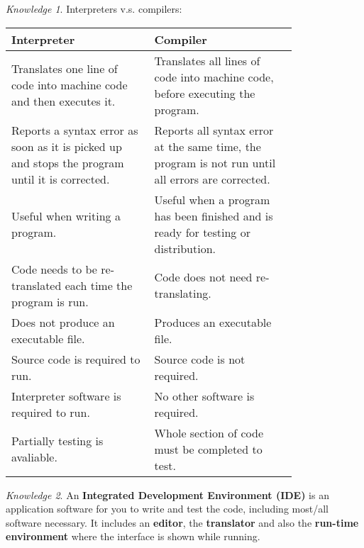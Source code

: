 \documentclass[8pt]{article}
\theoremstyle{remark}
\newtheorem{knowledge}{Knowledge}[subsection]
\begin{document}
            \begin{knowledge}
                Interpreters v.s. compilers:
                \begin{center}
                    \begin{tabular}{p{0.4\linewidth}|p{0.4\linewidth}}
                        Interpreter & Compiler\\\hline\hline
                        Translates one line of code into machine code and then executes it. & Translates all lines of code into machine code, before executing the program. \\\hline
                        Reports a syntax error as soon as it is picked up and stops the program until it is corrected. & Reports all syntax error at the same time, the program is not run until all errors are corrected. \\\hline
                        Useful when writing a program. & Useful when a program has been finished and is ready for testing or distribution. \\\hline
                        Code needs to be re-translated each time the program is run. & Code does not need re-translating.\\\hline
                        Does not produce an executable file. & Produces an executable file.\\\hline
                        Source code is required to run. & Source code is not required.\\\hline
                        Interpreter software is required to run. & No other software is required.\\\hline
                        Partially testing is avaliable. & Whole section of code must be completed to test.
                    \end{tabular}
                \end{center}
            \end{knowledge}

            \begin{knowledge}
                An \textbf{Integrated Development Environment (IDE)} is an application software for you to write and test the code, including most/all software necessary. It includes an \textbf{editor}, the \textbf{translator} and also the \textbf{run-time environment} where the interface is shown while running.
            \end{knowledge}
\end{document}
